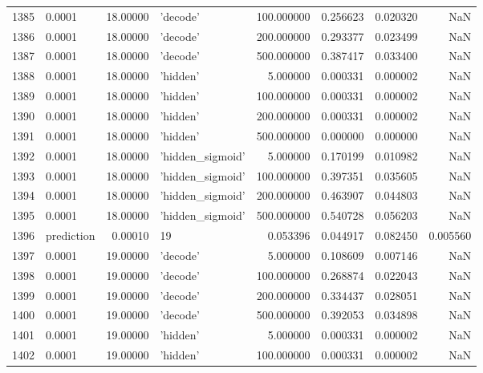 \documentclass[10pt,a4paper]{article}
\begin{document}
\begin{tabular}{llrlrrrr}
1385 &      0.0001 &  18.00000 &           'decode' &  100.000000 &  0.256623 &  0.020320 &       NaN \\
1386 &      0.0001 &  18.00000 &           'decode' &  200.000000 &  0.293377 &  0.023499 &       NaN \\
1387 &      0.0001 &  18.00000 &           'decode' &  500.000000 &  0.387417 &  0.033400 &       NaN \\
1388 &      0.0001 &  18.00000 &           'hidden' &    5.000000 &  0.000331 &  0.000002 &       NaN \\
1389 &      0.0001 &  18.00000 &           'hidden' &  100.000000 &  0.000331 &  0.000002 &       NaN \\
1390 &      0.0001 &  18.00000 &           'hidden' &  200.000000 &  0.000331 &  0.000002 &       NaN \\
1391 &      0.0001 &  18.00000 &           'hidden' &  500.000000 &  0.000000 &  0.000000 &       NaN \\
1392 &      0.0001 &  18.00000 &   'hidden\_sigmoid' &    5.000000 &  0.170199 &  0.010982 &       NaN \\
1393 &      0.0001 &  18.00000 &   'hidden\_sigmoid' &  100.000000 &  0.397351 &  0.035605 &       NaN \\
1394 &      0.0001 &  18.00000 &   'hidden\_sigmoid' &  200.000000 &  0.463907 &  0.044803 &       NaN \\
1395 &      0.0001 &  18.00000 &   'hidden\_sigmoid' &  500.000000 &  0.540728 &  0.056203 &       NaN \\
1396 &  prediction &   0.00010 &                 19 &    0.053396 &  0.044917 &  0.082450 &  0.005560 \\
1397 &      0.0001 &  19.00000 &           'decode' &    5.000000 &  0.108609 &  0.007146 &       NaN \\
1398 &      0.0001 &  19.00000 &           'decode' &  100.000000 &  0.268874 &  0.022043 &       NaN \\
1399 &      0.0001 &  19.00000 &           'decode' &  200.000000 &  0.334437 &  0.028051 &       NaN \\
1400 &      0.0001 &  19.00000 &           'decode' &  500.000000 &  0.392053 &  0.034898 &       NaN \\
1401 &      0.0001 &  19.00000 &           'hidden' &    5.000000 &  0.000331 &  0.000002 &       NaN \\
1402 &      0.0001 &  19.00000 &           'hidden' &  100.000000 &  0.000331 &  0.000002 &       NaN \\

\end{tabular}
\end{document}
